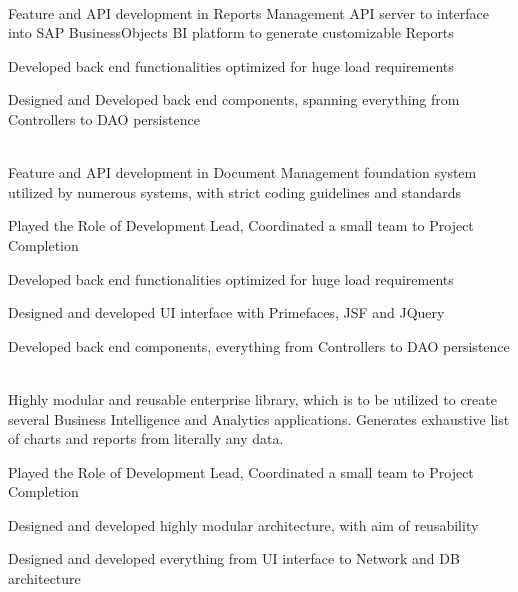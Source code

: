 \documentclass[]{deedy-resume-openfont}
\begin{document}
\hfill {}\\
Feature and API development in Reports Management API server to interface into SAP BusinessObjects BI platform to generate customizable Reports\\
\begin{tightemize}
	\item Developed back end functionalities optimized for huge load requirements
	\item Designed and Developed back end components, spanning everything from Controllers to DAO persistence
\end{tightemize}
\sectionsep

\hfill {}\\
Feature and API development in Document Management foundation system utilized by numerous systems, with strict coding guidelines and standards\\
\begin{tightemize}
	\item Played the Role of Development Lead, Coordinated a small team to Project Completion
	\item Developed back end functionalities optimized for huge load requirements
	\item Designed and developed UI interface with Primefaces, JSF and JQuery
	\item Developed back end components, everything from Controllers to DAO persistence
\end{tightemize}
\sectionsep
 
 \clearpage

\hfill {}\\
Highly modular and reusable enterprise library, which is to be utilized to create several Business Intelligence and Analytics applications. Generates exhaustive list of charts and reports from literally any data.\\
\begin{tightemize}
	\item Played the Role of Development Lead, Coordinated a small team to Project Completion
	\item Designed and developed highly modular architecture, with aim of reusability
	\item Designed and developed everything from UI interface to Network and DB architecture
\end{tightemize}
\sectionsep
\end{document}

